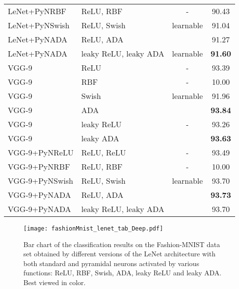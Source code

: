 \documentclass[pdflatex,sn-mathphys]{sn-jnl}
\theoremstyle{thmstyleone}
\theoremstyle{thmstyletwo}\newtheorem{example}{Example}\newtheorem{remark}{Remark}
\theoremstyle{thmstylethree}\newtheorem{definition}{Definition}\DeclareMathOperator{\sinc}{sinc}
\begin{document}
\begin{table}[!t]
{\begin{center}
\begin{tabular}{llcc}
LeNet+PyNRBF                    & ReLU, RBF 	    & -	                    & 90.43\\
LeNet+PyNSwish                  & ReLU, Swish 	    & learnable     & 91.04\\
LeNet+PyNADA                    & ReLU, ADA 	    & 	        & 91.27\\
LeNet+PyNADA                    & leaky ReLU, leaky ADA & learnable & {\bf 91.60}\\
\toprule
VGG-9                          & ReLU		        & -	            	    & 93.39\\
VGG-9                          & RBF 		        & -              	    & 10.00\\
VGG-9                          & Swish		        & learnable     & 91.96\\
VGG-9                          & ADA 		        &           & {\bf 93.84}\\
\midrule
VGG-9                          & leaky ReLU	    & -             	        & 93.26\\
VGG-9                          & leaky ADA 	    & 	            & {\bf 93.63}\\
\midrule
VGG-9+PyNReLU                   & ReLU, ReLU 	    & - 	                & 93.49\\
VGG-9+PyNRBF                    & ReLU, RBF 	    & -	                    & 10.00\\
VGG-9+PyNSwish                  & ReLU, Swish 	    & learnable     & 93.70\\
VGG-9+PyNADA                   & ReLU, ADA 	    & 	            & {\bf 93.73}\\
VGG-9+PyNADA                   & leaky ReLU, leaky ADA &   	    & 93.70\\
\bottomrule
\end{tabular}
\end{center}
}
\end{table}

\begin{figure}[!t]
\begin{center}
\centerline{\texttt{[image: fashionMnist\_lenet\_tab\_Deep.pdf]}}
\caption{Bar chart of the classification results on the Fashion-MNIST data set obtained by different versions of the LeNet architecture with both standard and pyramidal neurons activated by various functions: ReLU, RBF, Swish, ADA, leaky ReLU and leaky ADA. Best viewed in color.}
\label{fig_tab_fashion_lenet}
\end{center}
\end{figure}
\end{document}
